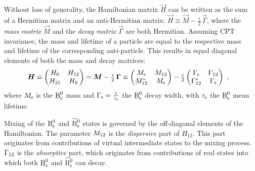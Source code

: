 Without loss of generality, the Hamiltonian matrix $\vec{H}$ can be written as the sum of a Hermitian matrix and an anti-Hermitian matrix:
$\vec{H} \equiv \vec{M} - \tfrac{i}{2}\,\vec{\Gamma}$, where the \emph{mass matrix} $\vec{M}$ and the \emph{decay matrix} $\vec{\Gamma}$
are both Hermitian. Assuming CPT invariance, the mass and lifetime of a particle are equal to the respective mass and lifetime of the
corresponding anti-particle. This results in equal diagonal elements of both the mass and decay matrices:
\begin{equation}
  \label{eq:timeEvolHamil}
  \bm{H}
    \equiv \begin{pmatrix} H_0 & H_{12} \\ H_{21} & H_0 \end{pmatrix}
    = \bm{M} - \tfrac{i}{2}\,\bm{\Gamma}
    \equiv \begin{pmatrix} M_\text{s} & M_{12} \\ M_{12}^* & M_\text{s} \end{pmatrix}
      - \tfrac{i}{2} \begin{pmatrix} \Gamma_\text{s} & \Gamma_{12} \\ \Gamma_{12}^* & \Gamma_\text{s} \end{pmatrix}
    \ ,
\end{equation}
where $M_\text{s}$ is the $\text{B}_\text{s}^0$ mass and $\Gamma_\text{s}=\frac{1}{\tau_\text{s}}$ the $\text{B}_\text{s}^0$ decay width, with $\tau_\text{s}$ the $\text{B}_\text{s}^0$ mean lifetime.

Mixing of the $\text{B}_\text{s}^0$ and $\Bsbar$ states is governed by the off-diagonal elements of the Hamiltonian. The parameter $M_{12}$ is the
\emph{dispersive} part of $H_{12}$. This part originates from contributions of virtual intermediate states to the mixing process.
$\Gamma_{12}$ is the \emph{absorptive} part, which originates from contributions of real states into which both $\text{B}_\text{s}^0$ and $\Bsbar$ can decay.

